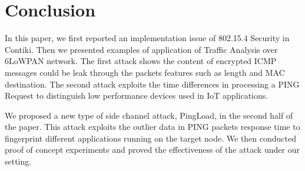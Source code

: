 \section{Conclusion \label{conclusion}}

In this paper, we first reported an implementation issue of 802.15.4 Security in Contiki. Then we presented examples of application of Traffic Analysis over 6LoWPAN network. The first attack shows the content of encrypted ICMP messages could be leak through the packets features such as length and MAC destination. The second attack exploits the time differences in processing a PING Request to distinguish low performance devices used in IoT applications.

We proposed a new type of side channel attack, PingLoad, in the second half of the paper. This attack exploits the outlier data in PING packets response time to fingerprint different applications running on the target node. We then conducted proof of concept experiments and proved the effectiveness of the attack under our setting.